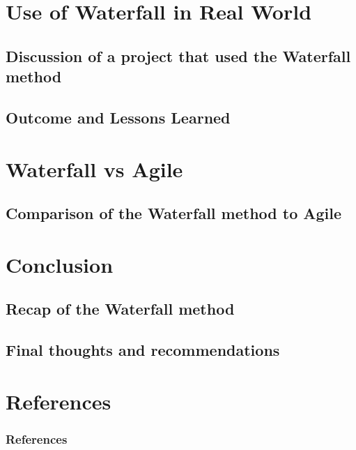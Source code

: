 \documentclass{beamer}
\begin{document}
\section{Use of Waterfall in Real World}
\subsection{Discussion of a project that used the Waterfall method}
\subsection{Outcome and Lessons Learned}




\section{Waterfall vs Agile}
\subsection{Comparison of the Waterfall method to Agile}


\section{Conclusion}
\subsection{Recap of the Waterfall method}
\subsection{Final thoughts and recommendations}



\section*{References}
\begin{frame}
    \frametitle{References}
    
    
\end{frame}
\end{document}
